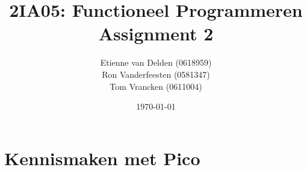 \documentclass[12pt]{article}
\begin{document}
	
	
	\title{2IA05: Functioneel Programmeren\\
            Assignment 2}
	
	\author{Etienne van Delden (0618959)\\
            Ron Vanderfeesten (0581347)\\
            Tom Vrancken (0611004)}
		
	\date{\today}
	
		
	\maketitle
	
	
	
	\section{Kennismaken met Pico} 
	
\end{document}
